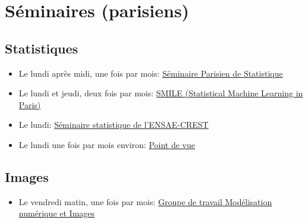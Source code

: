 \section{Séminaires (parisiens)}

\subsection{Statistiques}

\begin{itemize}
 \item Le lundi après midi, une fois par mois:
 \href{https://sites.google.com/site/semstats/}{Séminaire Parisien de Statistique}
 \item Le lundi et jeudi, deux fois par mois:  
\href{https://sites.google.com/site/smileinparis/home}{SMILE (Statistical Machine Learning in Paris)}
 \item Le lundi: 
\href{http://certis.enpc.fr/~dalalyan/seminar.html}{Séminaire statistique de l'ENSAE-CREST}
 \item Le lundi une fois par mois environ:  
\href{http://dominiquepicard.blogspot.fr/p/seminaire-point-de-vue.html}{Point de vue}
\end{itemize}



\subsection{Images}
\begin{itemize}
 
 \item Le vendredi matin, une fois par mois:
 \href{http://w3.mi.parisdescartes.fr/map5/-Groupe-de-travail-Modelisation-}
{Groupe de travail Modélisation numérique et Images
}
\end{itemize}
